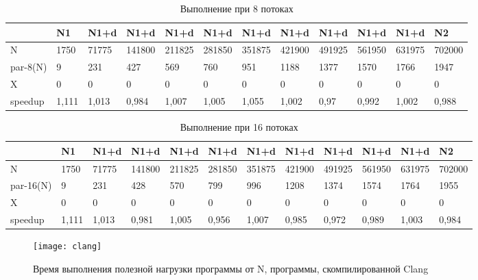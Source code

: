 \documentclass[a4paper,14pt,russian]{extarticle}
\begin{document}
\begin{table}[H]
	\caption{Выполнение при 8 потоках}
	\label{clang-8}
	\begin{adjustbox}{width=\textwidth,nofloat=table}
		\begin{tabular}{|l|l|l|l|l|l|l|l|l|l|l|l|}
			\hline
			& N1   & N1+d  & N1+d   & N1+d   & N1+d   & N1+d   & N1+d   & N1+d   & N1+d   & N1+d   & N2     \\ \hline
N        & 1750  & 71775 & 141800 & 211825 & 281850 & 351875 & 421900 & 491925 & 561950 & 631975 & 702000 \\ \hline
par-8(N) & 9     & 231   & 427    & 569    & 760    & 951    & 1188   & 1377   & 1570   & 1766   & 1947   \\ \hline
X        & 0     & 0     & 0      & 0      & 0      & 0      & 0      & 0      & 0      & 0      & 0      \\ \hline
speedup  & 1,111 & 1,013 & 0,984  & 1,007  & 1,005  & 1,055  & 1,002  & 0,97   & 0,992  & 1,002  & 0,988  \\ \hline
		\end{tabular}
	\end{adjustbox}
\end{table}

\begin{table}[H]
	\caption{Выполнение при 16 потоках}
	\label{clang-16}
	\begin{adjustbox}{width=\textwidth,nofloat=table}
		\begin{tabular}{|l|l|l|l|l|l|l|l|l|l|l|l|}
			\hline
			& N1   & N1+d  & N1+d   & N1+d   & N1+d   & N1+d   & N1+d   & N1+d   & N1+d   & N1+d   & N2     \\ \hline
N         & 1750  & 71775 & 141800 & 211825 & 281850 & 351875 & 421900 & 491925 & 561950 & 631975 & 702000 \\ \hline
par-16(N) & 9     & 231   & 428    & 570    & 799    & 996    & 1208   & 1374   & 1574   & 1764   & 1955   \\ \hline
X         & 0     & 0     & 0      & 0      & 0      & 0      & 0      & 0      & 0      & 0      & 0      \\ \hline
speedup   & 1,111 & 1,013 & 0,981  & 1,005  & 0,956  & 1,007  & 0,985  & 0,972  & 0,989  & 1,003  & 0,984  \\ \hline
		\end{tabular}
	\end{adjustbox}
\end{table}

\begin{figure}[H]
	\centering
	\texttt{[image: clang]}
	\caption{Время выполнения полезной нагрузки программы от N, программы, скомпилированной Clang}
	\label{pic:clang}
\end{figure}
\end{document}
